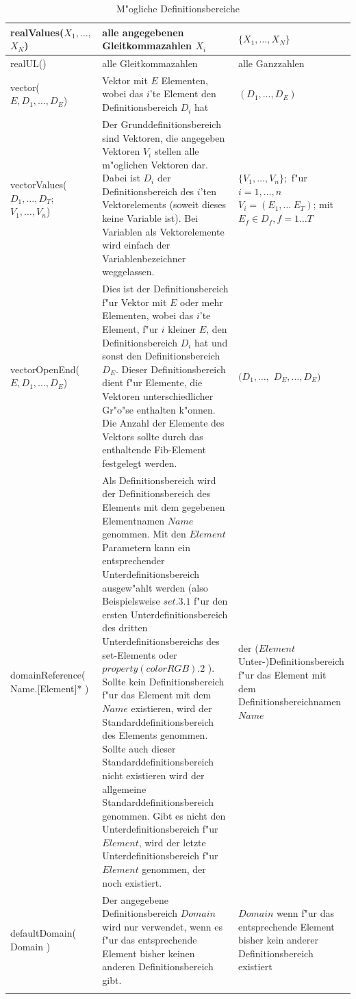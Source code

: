 \begin{small}
\begin{center}
\begin{longtable}{|p{30mm}|p{55mm}|p{37mm}|}
	realValues($X_1, \ldots ,$ $ X_N$) & alle angegebenen Gleitkommazahlen $X_i$  & $\{X_1, \ldots , X_N\}$\\\hline
	realUL() & alle Gleitkommazahlen & alle Ganzzahlen\\\hline

	vector( $E , D_1, \ldots , D_E$) & Vektor mit $E$ Elementen, wobei das $i$'te Element den Definitionsbereich $D_i$ hat & $(D_1, \ldots , D_E)$\\\hline
	vectorValues( $D_1, \ldots , D_T$; $V_1, \ldots , V_n$) & Der Grunddefinitionsbereich sind Vektoren, die angegeben Vektoren $V_i$ stellen alle m"oglichen Vektoren dar. Dabei ist $D_i$ der Definitionsbereich des $i$'ten Vektorelements (soweit dieses keine Variable ist). Bei Variablen als Vektorelemente wird einfach der Variablenbezeichner weggelassen. & $\{ V_1, \ldots , V_n \};$ f"ur $i=1, \ldots, n$ $V_i = (E_1, \ldots \ E_T )$; mit $E_f \in D_f, f=1 \ldots T$\\\hline
	vectorOpenEnd( $E , D_1, \ldots , D_E$) & Dies ist der Definitionsbereich f"ur Vektor mit $E$ oder mehr Elementen, wobei das $i$'te Element, f"ur $i$ kleiner $E$, den Definitionsbereich $D_i$ hat und sonst den Definitionsbereich $D_E$. Dieser Definitionsbereich dient f"ur Elemente, die Vektoren unterschiedlicher Gr"o"se enthalten k"onnen. Die Anzahl der Elemente des Vektors sollte durch das enthaltende Fib-Element festgelegt werden. & $(D_1, \ldots ,$ $D_E, \ldots, D_E)$\\\hline

	domainReference( Name.[Element]* ) & Als Definitionsbereich wird der Definitionsbereich des Elements mit dem gegebenen Element\-namen $Name$ genommen. Mit den $Element$ Parametern kann ein entsprechender Unterdefinitionsbereich ausgew"ahlt werden (also Beispielsweise $set.3.1$ f"ur den ersten Unterdefinitionsbereich des dritten Unterdefinitionsbereichs des set-Elements oder $property( colorRGB).2$ ). Sollte kein Definitionsbereich f"ur das Element mit dem $Name$ existieren, wird der Standarddefinitionsbereich des Elements genommen. Sollte auch dieser Standarddefinitionsbereich nicht existieren wird der allgemeine Standarddefinitionsbereich genommen. Gibt es nicht den Unterdefinitionsbereich f"ur $Element$, wird der letzte Unterdefinitionsbereich f"ur $Element$ genommen, der noch existiert. & der ($Element$ Unter-)Definitionsbereich f"ur das Element mit dem Definitions\-bereich\-namen $Name$ \\\hline

	defaultDomain( Domain ) & Der angegebene Definitionsbereich $Domain$ wird nur verwendet, wenn es f"ur das entsprechende Element bisher keinen anderen Definitionsbereich gibt. & $Domain$ wenn f"ur das entsprechende Element bisher kein anderer Definitionsbereich existiert \\\hline

\caption{M"ogliche Definitionsbereiche}
\label{tableDomains}
\end{longtable}
\end{center}
\end{small}


